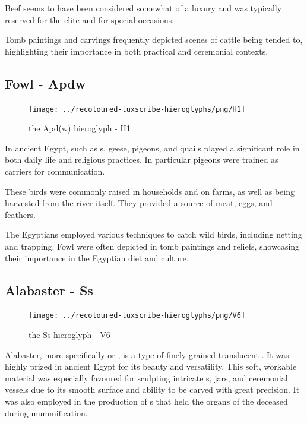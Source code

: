 Beef seems to have been considered somewhat of a luxury and was typically reserved for the elite and for special occasions.

Tomb paintings and carvings frequently depicted scenes of cattle being tended to, highlighting their importance in both practical and ceremonial contexts.

\subsection*{Fowl - Apdw}

\begin{figure} [H]
	\centering
	\texttt{[image: ../recoloured-tuxscribe-hieroglyphs/png/H1]}
	\caption{the Apd(w) hieroglyph - H1}
\end{figure}

In ancient Egypt,  such as s, geese, pigeons, and quails played a significant role in both daily life and religious practices. In particular pigeons were trained as carriers for communication.

These birds were commonly raised in households and on farms, as well as being harvested from the river itself. They provided a source of meat, eggs, and feathers.

The Egyptians employed various techniques to catch wild birds, including netting and trapping. Fowl were often depicted in tomb paintings and reliefs, showcasing their importance in the Egyptian diet and culture.

\subsection*{Alabaster - Ss}

\begin{figure} [H]
	\centering
	\texttt{[image: ../recoloured-tuxscribe-hieroglyphs/png/V6]}
	\caption{the Ss hieroglyph - V6}
\end{figure}

Alabaster, more specifically   or , is a type of finely-grained translucent . It was highly prized in ancient Egypt for its beauty and versatility. This soft, workable material was especially favoured for sculpting intricate s, jars, and ceremonial vessels due to its smooth surface and ability to be carved with great precision. It was also employed in the production of s that held the organs of the deceased during mummification.

